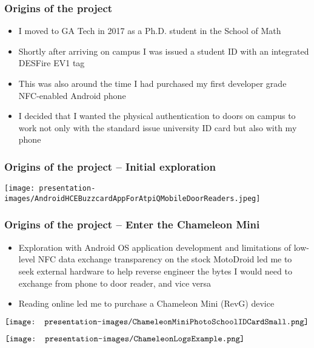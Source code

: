 \documentclass[usenames,svgnames,dvipsnames,11pt]{beamer}
\begin{document}
\begin{frame}
\frametitle{Origins of the project}

\begin{itemize}

\item I moved to GA Tech in 2017 as a Ph.D. student in the School of Math
\item Shortly after arriving on campus I was issued a student ID with an integrated DESFire EV1 tag
\item This was also around the time I had purchased my first developer grade NFC-enabled Android phone
\item I decided that I wanted the physical authentication to doors on campus to work not only with the 
      standard issue university ID card but also with my phone

\end{itemize}

\end{frame}

\begin{frame}
\frametitle{Origins of the project -- Initial exploration}

\begin{center}
\texttt{[image: presentation-images/AndroidHCEBuzzcardAppForAtpiQMobileDoorReaders.jpeg]}
\end{center}

\end{frame}

\begin{frame}
\frametitle{Origins of the project -- Enter the Chameleon Mini}

\begin{itemize}

\item Exploration with Android OS application development and limitations of low-level NFC data exchange 
      transparency on the stock MotoDroid led me to seek external hardware to help reverse engineer the 
      bytes I would need to exchange from phone to door reader, and vice versa
\item Reading online led me to purchase a Chameleon Mini (RevG) device 

\end{itemize}

\bigskip
{}
\begin{center}
$\vcenter{\hbox{\texttt{[image: presentation-images/ChameleonMiniPhotoSchoolIDCardSmall.png]}}}$
\end{center}
\endminipage\hfil
{}
\begin{center}
$\vcenter{\hbox{\texttt{[image: presentation-images/ChameleonLogsExample.png]}}}$
\end{center}
\endminipage

\end{frame}
\end{document}
